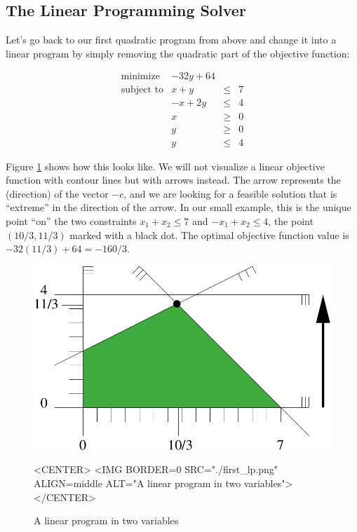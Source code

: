 \subsection{The Linear Programming Solver}
Let's go back to our first quadratic program from above and change it 
into a linear program by simply removing the quadratic part of the
objective function:

\[
\begin{array}{lrcl}
\mbox{minimize}       & - 32y + 64 \\
\mbox{subject to}     & x + y &\leq& 7 \\
                      & -x + 2y &\leq& 4 \\
                      & x &\geq& 0 \\
                      & y &\geq& 0 \\
                      & y &\leq& 4
\end{array}
\] 

Figure \ref{fig:QP-first_lp} shows how this looks like. We will not
visualize a linear objective function with contour lines but with
arrows instead. The arrow represents the (direction) of the vector $-c$,
and we are looking for a feasible solution that is ``extreme'' in the direction
of the arrow. In our small example, this is the unique point ``on'' the
two constraints $x_1+x_2\leq 7$ and $-x_1+x_2\leq 4$, the point
$(10/3,11/3)$ marked with a black dot. The optimal objective function
value is $-32(11/3)+64=-160/3$.

\begin{figure}[htbp]
\begin{ccTexOnly}
\begin{center}
\includegraphics{QP_solver/first_lp} %
\end{center}
\end{ccTexOnly}

\begin{ccHtmlOnly}
<CENTER>
<IMG BORDER=0 SRC="./first_lp.png" ALIGN=middle ALT="A linear program in two variables">
</CENTER>
\end{ccHtmlOnly}

\caption{A linear program in two variables
\label{fig:QP-first_lp}}
\end{figure}

